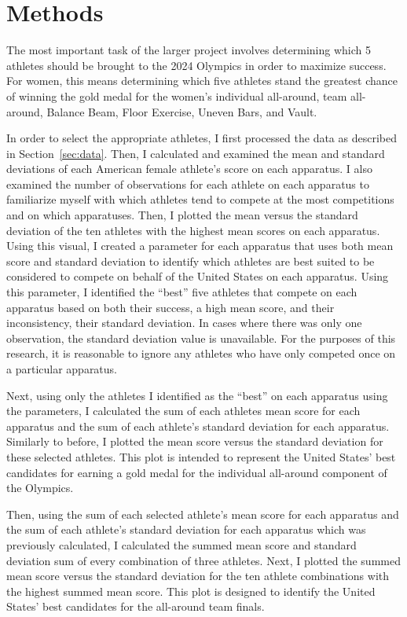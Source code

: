 \documentclass[12pt]{article}
\begin{document}
\section{Methods}
\label{sec:meth}

The most important task of the larger project involves determining which 5 athletes
should be brought to the 2024 Olympics in order to maximize success. For women, this means determining 
which five athletes stand the greatest chance of winning the gold medal for the women's individual all-around,
team all-around, Balance Beam, Floor Exercise, Uneven Bars, and Vault. 

In order to select the appropriate athletes, I first processed the data as described in Section~\ref{sec:data}.
Then, I calculated and examined the mean and standard deviations of each American female athlete's score 
on each apparatus. I also examined the number of observations for each athlete on each apparatus to familiarize 
myself with which athletes tend to compete at the most competitions and on which apparatuses. Then, I plotted 
the mean versus the standard deviation of the ten athletes with the highest mean scores on each apparatus. 
Using this visual, I created a parameter for each apparatus that uses both mean score and standard 
deviation to identify which athletes are best suited to be considered to compete on behalf of the United 
States on each apparatus. Using this parameter, I identified the ``best'' five athletes that compete on
each apparatus based on both their success, a high mean score, and their inconsistency, their standard deviation. 
In cases where there was only one observation, the standard deviation value is unavailable.
For the purposes of this research, it is reasonable to ignore any athletes who have only competed once on a particular apparatus.

Next, using only the athletes I identified as the ``best'' on each apparatus using the parameters, 
I calculated the sum of each athletes mean score for each apparatus and the sum of each athlete's standard 
deviation for each apparatus. Similarly to before, I plotted the mean score versus the standard deviation for 
these selected athletes. This plot is intended to represent
the United States' best candidates for earning a gold medal for the individual all-around component of the Olympics.

Then, using the sum of each selected athlete's mean score for each apparatus and the sum of each athlete's standard 
deviation for each apparatus which was previously calculated, I calculated the summed mean score and standard deviation sum 
of every combination of three athletes. Next, I plotted the summed mean score versus the standard deviation for the ten 
athlete combinations with the highest summed mean score. This plot is designed to identify the United States' best 
candidates for the all-around team finals.
\end{document}
